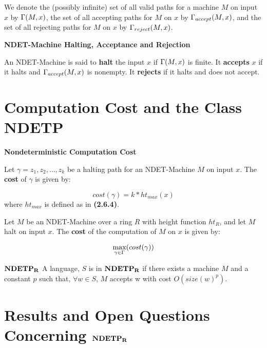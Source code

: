 We denote the (possibly infinite) set of all valid paths for a machine
$M$ on input $x$ by $\Gamma(M, x)$, the set of all accepting paths
for $M$ on $x$ by $\Gamma_{accept}(M, x)$, and the set of all rejecting paths 
for $M$ on $x$ by $\Gamma_{reject}(M, x)$.

\begin{definition} \textbf{NDET-Machine Halting, Acceptance and Rejection}

  An NDET-Machine is said to \textbf{halt} the input $x$ if
  $\Gamma(M, x)$ is finite.  It \textbf{accepts} $x$ if it halts
  and $\Gamma_{accept}(M, x)$ is nonempty.  It \textbf{rejects} if it halts
  and does not accept.
  
\end{definition}

\section{Computation Cost and the Class NDETP}

\begin{definition} \textbf{Nondeterministic Computation Cost}

  Let $\gamma = z_1, z_2, \ldots, z_k$ be a halting path for an
  NDET-Machine $M$ on input $x$.  The \textbf{cost} of $\gamma$ is
  given by:

  $$cost(\gamma) = k*ht_{max}(x)$$ where $ht_{max}$ is defined as in 
  \textbf{(2.6.4)}.

  Let $M$ be an NDET-Machine over a ring $R$ with height function
  $ht_R$, and let $M$ halt on input $x$.  The \textbf{cost} of the
  computation of $M$ on $x$ is given by:
  
  $$\max_{\gamma \in \Gamma}(cost(\gamma))$$

\end{definition}

\begin{definition} $\mathbf{NDETP_R}$
  A language, $S$ is in $\mathbf{NDETP_R}$ if there exists a machine $M$ and a
  constant $p$ such that, $\forall w \in S$, $M$ accepts w with cost
  $O(size(w)^p)$.
\end{definition}

\section{Results and Open Questions Concerning $\mathbf{NDETP_R}$}


